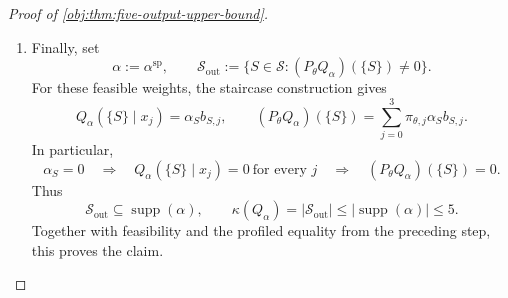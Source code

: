 \documentclass[11pt]{article}
\begin{document}
\begin{proof}[Proof of \cref{obj:thm:five-output-upper-bound}]
\begin{enumerate}
\item
Finally, set
\[
\alpha:=\alpha^{\mathrm{sp}},
\qquad
\mathcal S_{\mathrm{out}}
:=
\{S\in\mathcal S:(P_\theta Q_\alpha)(\{S\})\ne0\}.
\]
For these feasible weights, the staircase construction gives
\[
Q_\alpha(\{S\}\mid x_j)=\alpha_Sb_{S,j},
\qquad
(P_\theta Q_\alpha)(\{S\})
=
\sum_{j=0}^{3}\pi_{\theta,j}\alpha_Sb_{S,j}.
\]
In particular,
\[
\alpha_S=0
\quad\Longrightarrow\quad
Q_\alpha(\{S\}\mid x_j)=0\ \text{for every }j
\quad\Longrightarrow\quad
(P_\theta Q_\alpha)(\{S\})=0.
\]
Thus
\[
\mathcal S_{\mathrm{out}}\subseteq\operatorname{supp}(\alpha),
\qquad
\kappa(Q_\alpha)
=
|\mathcal S_{\mathrm{out}}|
\le|\operatorname{supp}(\alpha)|
\le5.
\]
Together with feasibility and the profiled equality from the preceding
step, this proves the claim.
\end{enumerate}
\end{proof}
\end{document}
